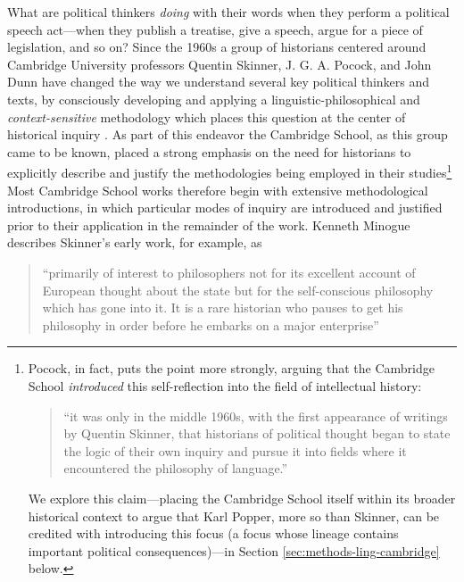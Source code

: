 \documentclass[11pt]{article}
\begin{document}
What are political thinkers \textit{doing} with their words when they perform a political speech act---when they publish a treatise, give a speech, argue for a piece of legislation, and so on? Since the 1960s a group of historians centered around Cambridge University professors Quentin Skinner, J. G. A. Pocock, and John Dunn have changed the way we understand several key political thinkers and texts,
by consciously developing and applying a linguistic-philosophical and \textit{context-sensitive} methodology which places this question at the center of historical inquiry \citep{skinner_meaning_1969, pocock_virtue_1985}. 
As part of this endeavor the Cambridge School, as this group came to be known, placed a strong emphasis on the need for historians to explicitly describe and justify the methodologies being employed in their studies\footnote{Pocock, in fact, puts the point more strongly, arguing that the Cambridge School \textit{introduced} this self-reflection into the field of intellectual history:
	\begin{quote}
		``it was only in the middle 1960s, with the first appearance of writings by Quentin Skinner, that historians of political thought began to state the logic of their own inquiry and pursue it into fields where it encountered the philosophy of language.'' \citep[p. 3]{pocock_virtue_1985}
	\end{quote}
	We explore this claim---placing the Cambridge School itself within its broader historical context to argue that Karl Popper, more so than Skinner, can be credited with introducing this focus (a focus whose lineage contains important political consequences)---in Section \ref{sec:methods-ling-cambridge} below.
}
Most Cambridge School works therefore begin with extensive methodological introductions, in which particular modes of inquiry are introduced and justified prior to their application in the remainder of the work. Kenneth Minogue describes Skinner's early work, for example, as
\begin{quote}
	``primarily of interest to philosophers not for its excellent account of European thought about the state but for the self-conscious philosophy which has gone into it. It is a rare historian who pauses to get his philosophy in order before he embarks on a major enterprise'' \citep[p. 176]{tully_meaning_1988}
\end{quote} %
\end{document}
